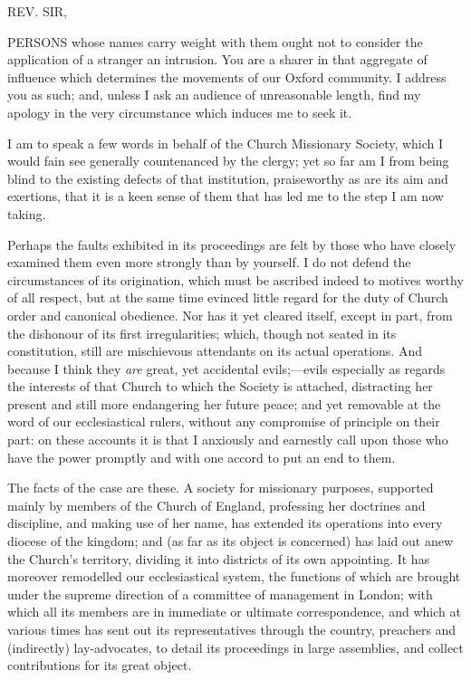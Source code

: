 


REV. SIR,

PERSONS whose names carry weight with them ought not to consider
the application of a stranger an intrusion. You are a sharer in that
aggregate of influence which determines the movements of our Oxford
community. I address you as such; and, unless I ask an audience of
unreasonable length, find my apology in the very circumstance which
induces me to seek it.

I am to speak a few words in behalf of the Church
Missionary Society, which I would fain see generally countenanced by
the clergy; yet so far am I from being blind to the existing defects
of that institution, praiseworthy as are its aim and exertions, that
it is a keen sense of them that has led me to the step I am now
taking.

Perhaps the faults exhibited in its proceedings
are felt by those who have closely examined them even more strongly
than by yourself. I do not defend the circumstances of its
origination, which must be ascribed indeed to motives worthy of
all respect, but at the same time evinced little regard for the duty
of Church order and canonical obedience. Nor has it yet cleared
itself, except in part, from the dishonour of its first
irregularities; which, though not seated in its constitution, still
are mischievous attendants on its actual operations. And because I
think they \emph{are} great, yet accidental evils;—evils especially as
regards the interests of that Church to which the Society is attached,
distracting her present and still more endangering her future peace;
and yet removable at the word of our ecclesiastical rulers, without
any compromise of principle on their part: on these accounts it is
that I anxiously and earnestly call upon those who have the power
promptly and with one accord to put an end to them.

The facts of the case are these. A society for
missionary purposes, supported mainly by members of the Church of
England, professing her doctrines and discipline, and making use of
her name, has extended its operations into every diocese of the
kingdom; and (as far as its object is concerned) has laid out anew the
Church's territory, dividing it into districts of its own appointing.
It has moreover remodelled our ecclesiastical system, the functions of
which are brought under the supreme direction of a committee of
management in London; with which all its members are in immediate or
ultimate correspondence, and which at various times has sent out its
representatives through the country, preachers and (indirectly)
lay-advocates, to detail its proceedings in large assemblies, and
collect contributions for its great object.

